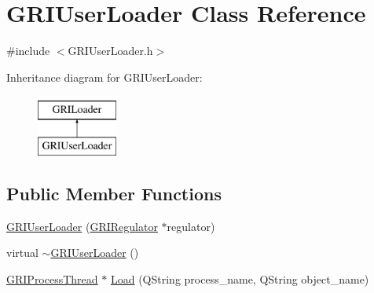 \hypertarget{classGRIUserLoader}{\section{\-G\-R\-I\-User\-Loader \-Class \-Reference}
\label{classGRIUserLoader}
}


{\ttfamily \#include $<$\-G\-R\-I\-User\-Loader.\-h$>$}

\-Inheritance diagram for \-G\-R\-I\-User\-Loader\-:\begin{figure}[H]
\begin{center}
\leavevmode
\includegraphics[height=2.000000cm]{classGRIUserLoader}
\end{center}
\end{figure}
\subsection*{\-Public \-Member \-Functions}
\begin{DoxyCompactItemize}
\item 
\hyperlink{classGRIUserLoader_a559f71cc1d19c6fcb2a7637d75dacd2e}{\-G\-R\-I\-User\-Loader} (\hyperlink{classGRIRegulator}{\-G\-R\-I\-Regulator} $\ast$regulator)
\item 
virtual \hyperlink{classGRIUserLoader_aca14856378139217c2ea3c2fe6ef09f2}{$\sim$\-G\-R\-I\-User\-Loader} ()
\item 
\hyperlink{classGRIProcessThread}{\-G\-R\-I\-Process\-Thread} $\ast$ \hyperlink{classGRIUserLoader_ae066002b550a6778362f61695463ba6a}{\-Load} (\-Q\-String process\-\_\-name, \-Q\-String object\-\_\-name)
\end{DoxyCompactItemize}


